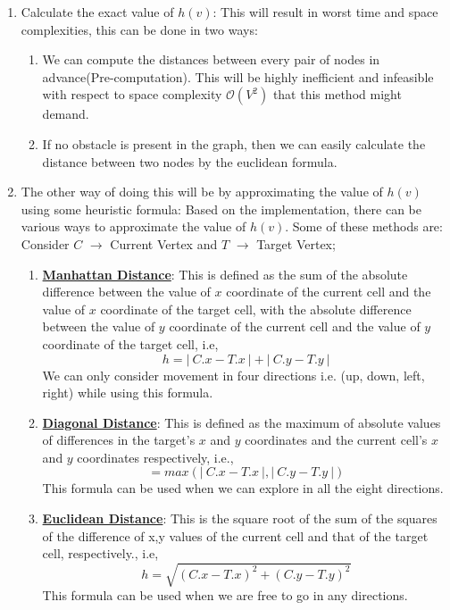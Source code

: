 \documentclass{article}
\theoremstyle{definition}
\begin{document}
	\begin{enumerate}
		\item Calculate the exact value of $h(v)$: This will result in worst time and space complexities, this can be done in two ways:
		\begin{enumerate}
			\item We can compute the distances between every pair of nodes in advance(Pre-computation). This will be highly inefficient and infeasible with respect to space complexity $\mathcal{O}(V^2)$ that this method might demand.
			\item If no obstacle is present in the graph, then we can easily calculate the distance between two nodes by the euclidean formula.
		\end{enumerate}
		\item The other way of doing this will be by approximating the value of $h(v)$ using some heuristic formula: Based on the implementation, there can be various ways to approximate the value of $h(v)$. Some of these methods are:
		Consider $C$ $\longrightarrow$ Current Vertex and $T$ $\longrightarrow$ Target Vertex;
		\begin{enumerate}
			\item \underline{\textbf{Manhattan Distance}}: This is defined as the sum of the absolute difference between the value of $x$ coordinate of the current cell and the value of $x$ coordinate of the target cell, with the absolute difference between the value of $y$ coordinate of the current cell and the value of $y$ coordinate of the target cell, i.e,
			$$ h = | \ C.x - T.x \ | + | \ C.y - T.y \ | $$
		    We can only consider movement in four directions i.e. (up, down, left, right) while using this formula. 
			
			\item \underline{\textbf{Diagonal Distance}}: This is defined as the maximum of absolute values of differences in the target’s $x$ and $y$ coordinates and the current cell’s $x$ and $y$ coordinates respectively, i.e.,
			$$ = max(| \ C.x - T.x \ |,| \ C.y - T.y \ |) $$
			This formula can be used when we can explore in all the eight directions.
			
			\item \underline{\textbf{Euclidean Distance}}: This is the square root of the sum of the squares of the difference of x,y values of the current cell and that of the target cell, respectively., i.e,
			$$h = \sqrt{(C.x - T.x)^2 +(C.y - T.y)^2}$$
			This formula can be used when we are free to go in any directions.
		\end{enumerate}
	\end{enumerate}
\end{document}
